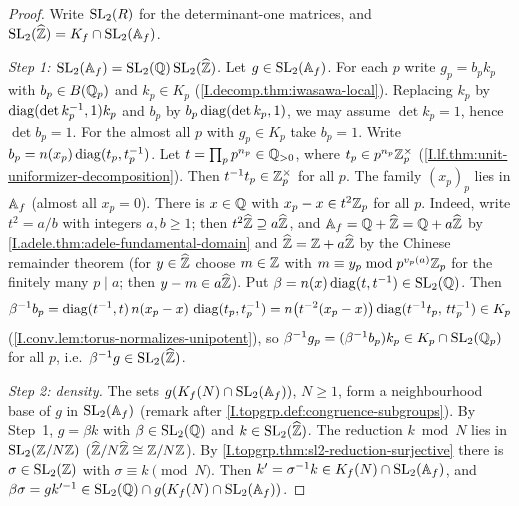 \begin{theorem}
\end{theorem}
\begin{proof}
Write $\mathrm{SL}_2(R)$ for the determinant-one matrices, and $\mathrm{SL}_2(\widehat{\mathbb{Z}})=K_f\cap\mathrm{SL}_2(\mathbb{A}_f)$.

\emph{Step 1: $\mathrm{SL}_2(\mathbb{A}_f)=\mathrm{SL}_2(\mathbb{Q})\,\mathrm{SL}_2(\widehat{\mathbb{Z}})$.} Let $g\in\mathrm{SL}_2(\mathbb{A}_f)$. For each $p$ write $g_p=b_pk_p$ with
$b_p\in B(\mathbb{Q}_p)$ and $k_p\in K_p$ (\cref{I.decomp.thm:iwasawa-local}). Replacing $k_p$ by $\operatorname{diag}(\det k_p^{-1},1)k_p$
and $b_p$ by $b_p\operatorname{diag}(\det k_p,1)$, we may assume $\det k_p=1$, hence $\det b_p=1$. For the almost all $p$ with
$g_p\in K_p$ take $b_p=1$. Write $b_p=n(x_p)\operatorname{diag}(t_p,t_p^{-1})$. Let $t=\prod_pp^{n_p}\in\mathbb{Q}_{>0}$, where
$t_p\in p^{n_p}\mathbb{Z}_p^\times$ (\cref{I.lf.thm:unit-uniformizer-decomposition}). Then $t^{-1}t_p\in\mathbb{Z}_p^\times$ for all
$p$. The family $(x_p)_p$ lies in $\mathbb{A}_f$ (almost all $x_p=0$). There is $x\in\mathbb{Q}$ with $x_p-x\in t^2\mathbb{Z}_p$ for all $p$. Indeed, write $t^2=a/b$ with integers $a,b\ge1$;
then $t^2\widehat{\mathbb{Z}}\supseteq a\widehat{\mathbb{Z}}$, and $\mathbb{A}_f=\mathbb{Q}+\widehat{\mathbb{Z}}=\mathbb{Q}+a\widehat{\mathbb{Z}}$ by \cref{I.adele.thm:adele-fundamental-domain} and
$\widehat{\mathbb{Z}}=\mathbb{Z}+a\widehat{\mathbb{Z}}$ by the Chinese remainder theorem (for $y\in\widehat{\mathbb{Z}}$ choose $m\in\mathbb{Z}$ with $m\equiv y_p\bmod p^{v_p(a)}\mathbb{Z}_p$ for the finitely many $p\mid a$; then $y-m\in a\widehat{\mathbb{Z}}$). Put $\beta=n(x)\operatorname{diag}(t,t^{-1})\in\mathrm{SL}_2(\mathbb{Q})$. Then
\[
  \beta^{-1}b_p=\operatorname{diag}(t^{-1},t)\,n(x_p-x)\,\operatorname{diag}(t_p,t_p^{-1})=n\bigl(t^{-2}(x_p-x)\bigr)\operatorname{diag}(t^{-1}t_p,\,tt_p^{-1})\in K_p
\]
(\cref{I.conv.lem:torus-normalizes-unipotent}), so $\beta^{-1}g_p=(\beta^{-1}b_p)k_p\in K_p\cap\mathrm{SL}_2(\mathbb{Q}_p)$ for all $p$,
i.e.\ $\beta^{-1}g\in\mathrm{SL}_2(\widehat{\mathbb{Z}})$.

\emph{Step 2: density.} The sets $g(K_f(N)\cap\mathrm{SL}_2(\mathbb{A}_f))$, $N\ge1$, form a neighbourhood base of $g$ in $\mathrm{SL}_2(\mathbb{A}_f)$
(remark after \cref{I.topgrp.def:congruence-subgroups}). By Step~1, $g=\beta k$ with $\beta\in\mathrm{SL}_2(\mathbb{Q})$ and
$k\in\mathrm{SL}_2(\widehat{\mathbb{Z}})$. The reduction $k\bmod N$ lies in $\mathrm{SL}_2(\mathbb{Z}/N\mathbb{Z})$ ($\widehat{\mathbb{Z}}/N\widehat{\mathbb{Z}}\cong\mathbb{Z}/N\mathbb{Z}$). By
\cref{I.topgrp.thm:sl2-reduction-surjective} there is $\sigma\in\mathrm{SL}_2(\mathbb{Z})$ with $\sigma\equiv k\pmod N$. Then
$k'=\sigma^{-1}k\in K_f(N)\cap\mathrm{SL}_2(\mathbb{A}_f)$, and $\beta\sigma=gk'^{-1}\in\mathrm{SL}_2(\mathbb{Q})\cap g(K_f(N)\cap\mathrm{SL}_2(\mathbb{A}_f))$.
\end{proof}

